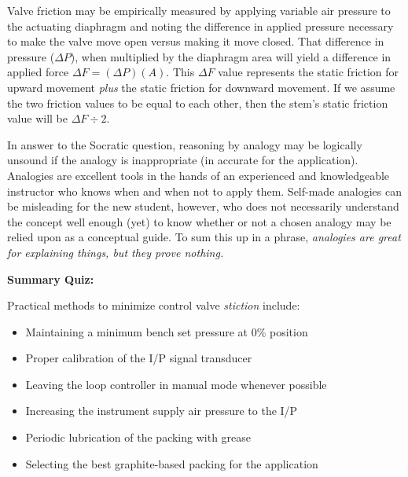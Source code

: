 \vskip 10pt

Valve friction may be empirically measured by applying variable air pressure to the actuating diaphragm and noting the difference in applied pressure necessary to make the valve move open versus making it move closed.  That difference in pressure ($\Delta P$), when multiplied by the diaphragm area will yield a difference in applied force $\Delta F = (\Delta P) (A)$.  This $\Delta F$ value represents the static friction for upward movement {\it plus} the static friction for downward movement.  If we assume the two friction values to be equal to each other, then the stem's static friction value will be $\Delta F \div 2$.

\vskip 10pt

In answer to the Socratic question, reasoning by analogy may be logically unsound if the analogy is inappropriate (in accurate for the application).  Analogies are excellent tools in the hands of an experienced and knowledgeable instructor who knows when and when not to apply them.  Self-made analogies can be misleading for the new student, however, who does not necessarily understand the concept well enough (yet) to know whether or not a chosen analogy may be relied upon as a conceptual guide.  To sum this up in a phrase, {\it analogies are great for explaining things, but they prove nothing.}

\vfil \eject

\noindent
{\bf Summary Quiz:}

Practical methods to minimize control valve {\it stiction} include:

\begin{itemize}
\item{} Maintaining a minimum bench set pressure at 0\% position
\vskip 5pt 
\item{} Proper calibration of the I/P signal transducer
\vskip 5pt 
\item{} Leaving the loop controller in manual mode whenever possible
\vskip 5pt 
\item{} Increasing the instrument supply air pressure to the I/P
\vskip 5pt 
\item{} Periodic lubrication of the packing with grease
\vskip 5pt 
\item{} Selecting the best graphite-based packing for the application
\end{itemize}





